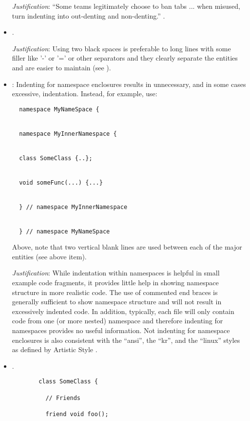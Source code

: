\begin{itemize}
{}\textit{Justification}: ``Some teams legitimately choose to ban tabs
... when misused, turn indenting into out-denting and non-denting.''
{}\cite[Item 0]{C++CodingStandards05}.


{}\item\FSCTwoVertialSpaces.


{}\textit{Justification}: Using two black spaces is preferable to long lines
with some filler like '-' or '=' or other separators and they clearly separate
the entities and are easier to maintain (see {}\cite[Section
31.8]{CodeComplete2nd04}).


{}\item\FSCNoNamespaceIndent: Indenting for namespace enclosures results in
unnecessary, and in some cases excessive, indentation.  Instead, for example,
use:

{\small\begin{verbatim}
  namespace MyNameSpace {


  namespace MyInnerNamespace {


  class SomeClass {..};


  void someFunc(...) {...}


  } // namespace MyInnerNamespace


  } // namespace MyNameSpace
\end{verbatim}}

Above, note that two vertical blank lines are used between each of the major
entities (see above item).

{}\textit{Justification}: While indentation within namespaces is helpful in
small example code fragments, it provides little help in showing namespace
structure in more realistic code.  The use of commented end braces is
generally sufficient to show namespace structure and will not result in
excessively indented code.  In addition, typically, each file will only
contain code from one (or more nested) namespace and therefore indenting for
namespaces provides no useful information.  Not indenting for namespace
enclosures is also consistent with the ``ansi'', the ``kr'', and the ``linux''
styles as defined by Artistic Style {}\cite{ArtisticStyle}.


{}\item\FSCClassDeclarationLayout.

\begin{figure}
%
{\small\begin{verbatim}
  class SomeClass {

    // Friends

    friend void foo();


\end{verbatim}}
\end{figure}
\end{itemize}
